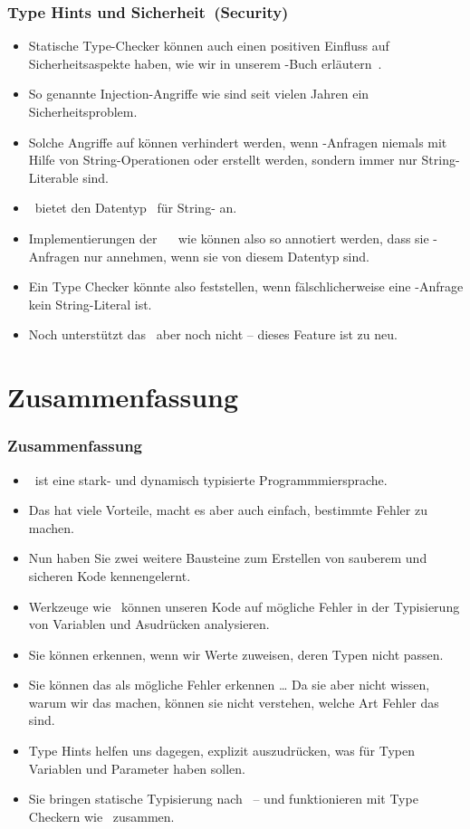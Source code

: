 \documentclass[aspectratio=169,mathserif,notheorems]{beamer}%
\begin{document}
\begin{frame}%
\frametitle{Type Hints und Sicherheit~(Security)}%
\begin{itemize}%
\item Statische Type-Checker können auch einen positiven Einfluss auf Sicherheitsaspekte haben, wie wir in unserem -Buch erläutern~\cite{databases}.%
%
\item<2-> So genannte Injection-Angriffe wie  sind seit vielen Jahren ein Sicherheitsproblem.%
\item<3-> Solche Angriffe auf  können verhindert werden, wenn \sql-Anfragen niemals mit Hilfe von String-Operationen oder  erstellt werden, sondern immer nur String-Literable sind.%
%
\item<4-> \python\ bietet den Datentyp~ für String- an\cite{PEP675}.%
%
\item<5-> Implementierungen der \python\ \db\  wie \psycopg\cite{VDGE2022PPDAFP:ST} können also so annotiert werden, dass sie \sql-Anfragen nur annehmen, wenn sie von diesem Datentyp sind.%
%
\item<6-> Ein Type Checker könnte also feststellen, wenn fälschlicherweise eine \sql-Anfrage kein String-Literal ist.%
%
\item<7-> Noch unterstützt das \mypy\ aber noch nicht -- dieses Feature ist zu neu\cite{ZDWVSLS2022I1SP6L,VDGE2022PPDAFP:ST}.%
%
\end{itemize}%
\end{frame}%
%
%
\section{Zusammenfassung}%
%
\begin{frame}%
\frametitle{Zusammenfassung}%
\begin{itemize}%
%
\item \python\ ist eine stark- und dynamisch typisierte Programmmiersprache.%
%
\item<2-> Das hat viele Vorteile, macht es aber auch einfach, bestimmte Fehler zu machen.%
%
\item<3-> Nun haben Sie zwei weitere Bausteine zum Erstellen von sauberem und sicheren Kode kennengelernt.%
%
\item<4-> Werkzeuge wie \mypy\ können unseren Kode auf mögliche Fehler in der Typisierung von Variablen und Asudrücken analysieren.%
%
\item<5-> Sie können erkennen, wenn wir Werte zuweisen, deren Typen nicht passen.%
%
\item<6-> Sie können das als mögliche Fehler erkennen {\dots} Da sie aber nicht wissen, warum wir das machen, können sie nicht verstehen, welche Art Fehler das sind.%
%
\item<7-> Type Hints helfen uns dagegen, explizit auszudrücken, was für Typen Variablen und Parameter haben sollen.%
%
\item<8-> Sie bringen statische Typisierung nach \python\ -- und funktionieren mit Type Checkern wie \mypy\ zusammen.%
\end{itemize}%
\end{frame}%
%
\endPresentation%
\end{document}
